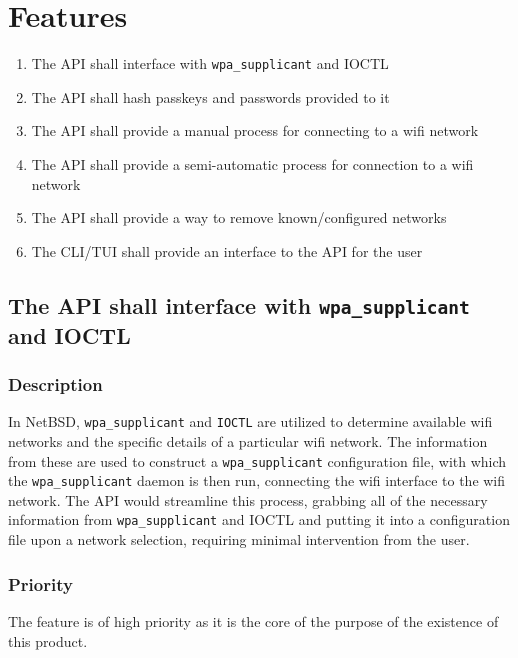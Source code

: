 \section{Features}

\begin{enumerate}
  \item The API shall interface with \texttt{wpa\_supplicant} and IOCTL
  \item The API shall hash passkeys and passwords provided to it
  \item The API shall provide a manual process for connecting to a wifi network
  \item The API shall provide a semi-automatic process for connection to a wifi network
  \item The API shall provide a way to remove known/configured networks
  \item The CLI/TUI shall provide an interface to the API for the user
\end{enumerate}


\subsection{The API shall interface with \texttt{wpa\_supplicant} and IOCTL}
\subsubsection{Description}
In NetBSD, \texttt{wpa\_supplicant} and \texttt{IOCTL} are utilized to determine available wifi networks and
the specific details of a particular wifi network. The information from these are used to
construct a \texttt{wpa\_supplicant} configuration file, with which the \texttt{wpa\_supplicant} daemon is
then run, connecting the wifi interface to the wifi network. The API would streamline this
process, grabbing all of the necessary information from \texttt{wpa\_supplicant} and IOCTL
and putting it into a configuration file upon a network selection, requiring minimal
intervention from the user.
\subsubsection{Priority}
The feature is of high priority as it is the core of the purpose of the existence of this 
product.

